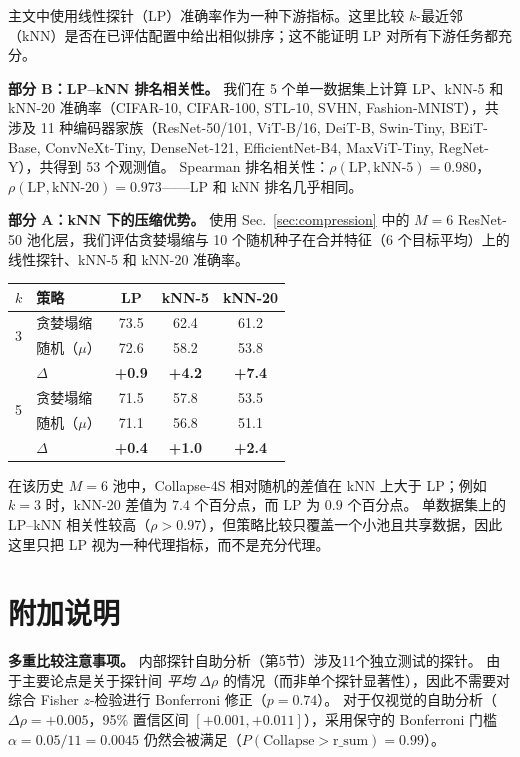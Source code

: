 \documentclass{article}
\begin{document}
主文中使用线性探针（LP）准确率作为一种下游指标。这里比较 $k$-最近邻（kNN）是否在已评估配置中给出相似排序；这不能证明 LP 对所有下游任务都充分。

\textbf{部分 B：LP--kNN 排名相关性。}
我们在 5 个单一数据集上计算 LP、kNN-5 和 kNN-20 准确率（CIFAR-10, CIFAR-100, STL-10, SVHN, Fashion-MNIST），共涉及 11 种编码器家族（ResNet-50/101, ViT-B/16, DeiT-B, Swin-Tiny, BEiT-Base, ConvNeXt-Tiny, DenseNet-121, EfficientNet-B4, MaxViT-Tiny, RegNet-Y），共得到 53 个观测值。
Spearman 排名相关性：$\rho(\text{LP},\text{kNN-5}){=}0.980$，$\rho(\text{LP},\text{kNN-20}){=}0.973$——LP 和 kNN 排名几乎相同。

\textbf{部分 A：kNN 下的压缩优势。}
使用 Sec.~\ref{sec:compression} 中的 $M{=}6$ ResNet-50 池化层，我们评估贪婪塌缩与 10 个随机种子在合并特征（6 个目标平均）上的线性探针、kNN-5 和 kNN-20 准确率。

\begin{center}
\setlength{\tabcolsep}{4pt}
\small
\begin{tabular}{llccc}
\toprule
$k$ & 策略 & LP & kNN-5 & kNN-20 \\
\midrule
\multirow{2}{*}{3}
  & 贪婪塌缩 & 73.5 & 62.4 & 61.2 \\
  & 随机（$\mu$） & 72.6 & 58.2 & 53.8 \\
  & $\Delta$ & \textbf{+0.9} & \textbf{+4.2} & \textbf{+7.4} \\
\midrule
\multirow{2}{*}{5}
  & 贪婪塌缩 & 71.5 & 57.8 & 53.5 \\
  & 随机（$\mu$） & 71.1 & 56.8 & 51.1 \\
  & $\Delta$ & \textbf{+0.4} & \textbf{+1.0} & \textbf{+2.4} \\
\bottomrule
\end{tabular}
\end{center}
在该历史 $M{=}6$ 池中，Collapse-4S 相对随机的差值在 kNN 上大于 LP；例如 $k=3$ 时，kNN-20 差值为 $7.4$ 个百分点，而 LP 为 $0.9$ 个百分点。
单数据集上的 LP--kNN 相关性较高（$\rho>0.97$），但策略比较只覆盖一个小池且共享数据，因此这里只把 LP 视为一种代理指标，而不是充分代理。

\section{附加说明}
\label{app:method_comparison}

\textbf{多重比较注意事项。}
内部探针自助分析（第5节）涉及11个独立测试的探针。
由于主要论点是关于探针间 \emph{平均} $\Delta\rho$ 的情况（而非单个探针显著性），因此不需要对综合 Fisher $z$-检验进行 Bonferroni 修正（$p=0.74$）。
对于仅视觉的自助分析（$\Delta\rho=+0.005$，95\% 置信区间 $[+0.001,+0.011]$），采用保守的 Bonferroni 门槛 $\alpha=0.05/11=0.0045$ 仍然会被满足（$P(\text{Collapse}>\text{r\_sum})=0.99$）。
\end{document}
